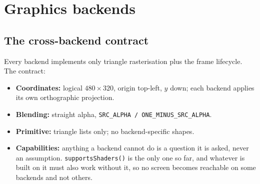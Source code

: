 \documentclass[11pt]{report}
\newcommand{\code}[1]{\texttt{#1}}
\begin{document}
\chapter{Graphics backends}
\section{The cross-backend contract}
Every backend implements only triangle rasterisation plus the frame lifecycle.
The contract:
\begin{itemize}[nosep]
  \item \textbf{Coordinates:} logical $480\times320$, origin top-left, $y$ down;
        each backend applies its own orthographic projection.
  \item \textbf{Blending:} straight alpha, \code{SRC\_ALPHA / ONE\_MINUS\_SRC\_ALPHA}.
  \item \textbf{Primitive:} triangle lists only; no backend-specific shapes.
  \item \textbf{Capabilities:} anything a backend cannot do is a question it is
        asked, never an assumption. \code{supportsShaders()} is the only one so
        far, and whatever is built on it must also work without it, so no screen
        becomes reachable on some backends and not others.
\end{itemize}
\end{document}
